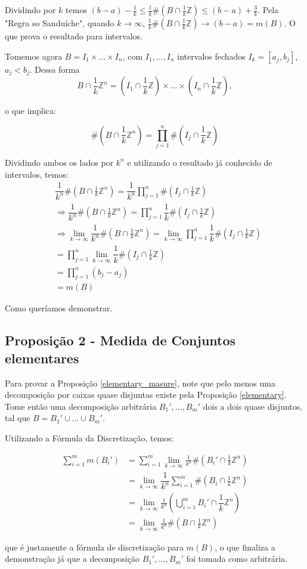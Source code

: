 \documentclass[12pt,letterpaper]{article}
\begin{document}
\begin{appendices}
		Dividindo por $k$ temos $(b-a)-\frac1k\leq\frac1k\#(B\cap\frac1k\mathbb{Z})\leq (b-a)+\frac3k$. Pela "Regra so Sanduíche", quando $k\to \infty$, $\frac1k\#(B\cap\frac1k\mathbb{Z})\to(b-a)=m(B)$. O que prova o resultado para intervalos.
		
		Tomemos agora $B=I_1\times\ldots\times I_n$, com $I_1,\ldots,I_n$ intervalos fechados $I_k=[a_j,b_j]$, $a_j<b_j$. Dessa forma
			$$B\cap\frac1k\mathbb{Z}^n=\left(I_1\cap\frac1k\mathbb{Z}\right)\times\ldots\times\left(I_n\cap\frac1k\mathbb{Z}\right),$$
			
			o que implica:
			
			$$\displaystyle\#\left(B\cap\frac1k\mathbb{Z}^n\right)=\prod_{j=1}^n\#\left(I_j\cap\frac1k\mathbb{Z}\right)$$
			
	
	Dividindo ambos os lados por $k^n$ e utilizando o resultado já conhecido de intervalos, temos:
	\begin{align*}
		&\dfrac{1}{k^n}\#\left(B\cap\frac1k\mathbb{Z}^n\right)=\dfrac{1}{k^n}\prod_{j=1}^n\#\left(I_j\cap\frac1k\mathbb{Z}\right)\\
		&\Rightarrow \dfrac{1}{k^n}\#\left(B\cap\frac1k\mathbb{Z}^n\right)=\prod_{j=1}^n\dfrac1k\#\left(I_j\cap\frac1k\mathbb{Z}\right)\\
		&\Rightarrow\lim_{k\to\infty}\dfrac{1}{k^n}\#\left(B\cap\frac1k\mathbb{Z}^n\right)=\lim_{k\to\infty}\prod_{j=1}^n\dfrac1k\#\left(I_j\cap\frac1k\mathbb{Z}\right)\\
		&=\prod_{j=1}^n\lim_{k\to\infty}\dfrac1k\#\left(I_j\cap\frac1k\mathbb{Z}\right)\\
		&=\prod_{j=1}^n(b_j-a_j)\\
		&=m(B)
	\end{align*}

	Como queríamos demonstrar.
	
	\subsection{Proposição 2 - Medida de Conjuntos elementares}
	
	Para provar a Proposição \ref{elementary_masure}, note que pelo menos uma decomposição por caixas quase disjuntas existe pela Proposição \ref{elementary}. Tome então uma decomposição arbitrária $B_1',\ldots,B_m'$ dois a dois quase disjuntos, tal que $B=B_1'\cup\ldots\cup B_m'$. 
	
	Utilizando a Fórmula da Discretização, temos:
	
	\begin{align*}
		\displaystyle\sum_{i=1}^{m}m(B_i')&=\sum_{i=1}^m\lim_{k\to\infty}\frac1{k^n}\#\left(B_i'\cap\frac1k\mathbb{Z}^n\right)\\
		&=\lim_{k\to\infty}\dfrac{1}{k^n}\sum_{i=1}^{m}\#\left(B_i\cap\frac1k\mathbb{Z}^n\right)\\
		&=\lim_{k\to\infty}\frac{1}{k^n}\left(\bigcup_{i=1}^m B_i'\cap\dfrac1k\mathbb{Z}^n\right)\\
		&=\lim_{k\to\infty}\frac{1}{k^n}\#\left(B\cap\frac1k\mathbb{Z}^n\right)
	\end{align*}

	que é justamente a fórmula de discretização para $m(B)$, o que finaliza a demonstração já que a decomposição $B_1',\ldots,B_m'$ foi tomada como arbitrária.
\end{appendices}
	\newpage
	\printbibliography
\end{document}
